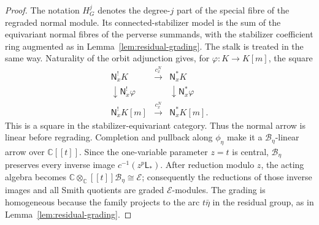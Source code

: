 \documentclass[11pt]{amsart}
\theoremstyle{definition}
\theoremstyle{remark}
\newcommand{\C}{\mathbb C}
\newcommand{\A}{\C[[t]]}
\begin{document}
\begin{proof}
The notation $H_G^j$ denotes the degree-$j$ part of the special
fibre of the regraded normal module.  Its connected-stabilizer model is
the sum of the equivariant normal fibres of the perverse summands,
with the stabilizer coefficient ring augmented as in
Lemma~\ref{lem:residual-grading}.  The stalk is treated in the same way.  Naturality of the orbit adjunction gives, for
$\varphi:K\to K[m]$, the square
\[
\begin{array}{ccc}
 \mathsf N_x^!K&\xrightarrow{c_x^N}&\mathsf N_x^*K\\
 \downarrow{\scriptstyle\mathsf N_x^!\varphi}&&
 \downarrow{\scriptstyle\mathsf N_x^*\varphi}\\
 \mathsf N_x^!K[m]&\xrightarrow{c_x^N}&\mathsf N_x^*K[m].
\end{array}
\]
This is a square in the stabilizer-equivariant category.  Thus the
normal arrow is linear before regrading.  Completion and pullback along
$\phi_\eta$ make it a $\mathcal B_\eta$-linear arrow over $\A$.  Since the
one-variable parameter $z=t$ is central, $\mathcal B_\eta$ preserves every inverse
image $c^{-1}(z^p\mathsf L_*)$.  After reduction modulo $z$, the acting
algebra becomes
$\mathbb C\otimes_\A \mathcal B_\eta\cong\mathcal E$; consequently the reductions
of those inverse images and all Smith quotients are graded
$\mathcal E$-modules.  The grading is homogeneous because the family
projects to the arc $t\bar\eta$ in the residual group, as in
Lemma~\ref{lem:residual-grading}.


\end{proof}
\end{document}
